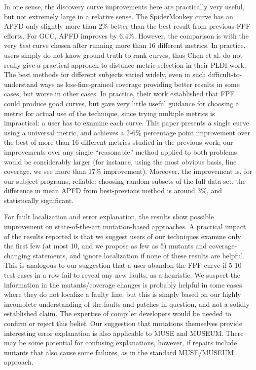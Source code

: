 In one sense, the discovery curve improvements here are practically very useful, but not extremely large in a relative sense.  The SpiderMonkey curve has an APFD only slightly more than 2\% better than the best result from previous FPF efforts.  For GCC, APFD improves by 6.4\%.  However, the comparison is with the very \emph{best} curve chosen after running more than 16 different metrics.  In practice, users simply do not know ground truth to rank curves, thus Chen et al. \cite{PLDI13} do not really give a practical approach to distance metric selection in their PLDI work.  The best methods for different subjects varied widely, even in such difficult-to-understand ways as less-fine-grained coverage providing better results in some cases, but worse in other cases.   In practice, their work established that FPF could produce good curves, but gave very little useful guidance for choosing a metric for actual use of the technique, since trying multiple metrics is impractical: a user has to examine each curve.    This paper presents a single curve using a universal metric, and achieves a 2-6\% percentage point improvement over the best of more than 16 different metrics studied in the previous work; our improvements over any single ``reasonable'' method applied to both problems would be considerably larger (for instance, using the most obvious basis, line coverage, we see more than 17\% improvement).  Moreover, the improvement is, for our subject programs, reliable:  choosing random subsets of the full data set, the difference in mean APFD from best-previous method is around 3\%, and statistically significant.

For fault localization and error explanation, the results show possible improvement on state-of-the-art mutation-based approaches.  A practical impact of the results reported is that we suggest users of our techniques examine only the first few (at most 10, and we propose as few as 5) mutants and coverage-changing statements, and ignore localization if none of these results are helpful.  This is analogous to our suggestion that a user abandon the FPF curve if 5-10 test cases in a row fail to reveal any new faults, as a heuristic.  We suspect the information in the mutants/coverage changes is probably helpful in some cases where they do not localize a faulty line, but this is simply based on our highly incomplete understanding of the faults and patches in question, and not a solidly established claim.  The expertise of compiler developers would be needed to confirm or reject this belief.  Our suggestion that mutations themselves provide interesting error explanation is also applicable to MUSE and MUSEUM.  There may be some potential for confusing explanations, however, if repairs include mutants that also cause some failures, as in the standard MUSE/MUSEUM approach.  

